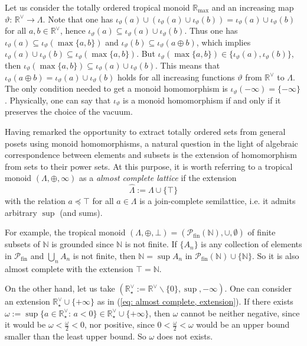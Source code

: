 \documentclass[11pt,british,reqno]{article}
\numberwithin{equation}{section}
\numberwithin{figure}{section}
\numberwithin{table}{section}
\theoremstyle{definition}
\theoremstyle{definition}
\theoremstyle{plain}
\theoremstyle{plain}
\theoremstyle{remark}
\theoremstyle{plain}
\numberwithin{equation}{section}
\numberwithin{figure}{section}
\numberwithin{table}{section}
\theoremstyle{plain}
\begin{document}
Let us consider the totally ordered tropical monoid $\mathbb{R}_{\max}$
and an increasing map $\vartheta:\,\mathbb{R}^{\vee}\longrightarrow\Lambda$.
Note that one has $\iota_{\vartheta}(a)\cup(\iota_{\vartheta}(a)\cup\iota_{\vartheta}(b))=\iota_{\vartheta}(a)\cup\iota_{\vartheta}(b)$
for all $a,b\in\mathbb{R}^{\vee}$, hence $\iota_{\vartheta}(a)\subseteq\iota_{\vartheta}(a)\cup\iota_{\vartheta}(b)$.
Thus one has $\iota_{\vartheta}(a)\subseteq\iota_{\vartheta}(\max\{a,b\})$
and $\iota_{\vartheta}(b)\subseteq\iota_{\vartheta}(a\oplus b)$, which
implies $\iota_{\vartheta}(a)\cup\iota_{\vartheta}(b)\subseteq\iota_{\vartheta}(\max\{a,b\})$.
But $\iota_{\vartheta}(\max\{a,b\})\in\{\iota_{\vartheta}(a),\iota_{\vartheta}(b)\}$,
then $\iota_{\vartheta}(\max\{a,b\})\subseteq\iota_{\vartheta}(a)\cup\iota_{\vartheta}(b)$.
This means that $\iota_{\vartheta}(a\oplus b)=\iota_{\vartheta}(a)\cup\iota_{\vartheta}(b)$
holds for all increasing functions $\vartheta$ from $\mathbb{R}^{\vee}$
to $\Lambda$. The only condition needed to get a monoid homomorphism
is $\iota_{\vartheta}(-\infty)=\{-\infty\}$. Physically, one can say
that $\iota_{\vartheta}$ is a monoid homomorphism if and only if it
preserves the choice of the vacuum. 

Having remarked the opportunity to extract totally ordered sets from general posets using monoid homomorphisms, a natural question in the light of algebraic correspondence between elements and subsets is the extension of homomorphism from sets to their power sets. At this purpose, it is worth referring to a tropical monoid $(\Lambda,\oplus,\infty)$ as a \textit{almost complete lattice} if the extension 
\begin{equation}
\hat{\Lambda}:=\Lambda\cup\{\top\}\label{eq: almost complete, extension}
\end{equation}
with the relation $a\preceq\top$ for all $a\in\Lambda$ is a join-complete
semilattice, i.e. it admits arbitrary $\sup$ (and sums). 

For example, the
tropical monoid $(\Lambda,\oplus,\bot)=(\mathcal{P}_{\mathrm{fin}}(\mathbb{N}),\cup,\emptyset)$ of finite subsets of $\mathbb{N}$ is grounded since $\mathbb{N}$ is not finite. If $\{A_{n}\}$ is any collection of elements in $\mathcal{P}_{\mathrm{fin}}$ and ${\displaystyle \bigcup_{n}A_{n}}$ is not finite, then $\mathbb{N}=\sup A_{n}$ in $\mathcal{P}_{\mathrm{fin}}(\mathbb{N})\cup\{\mathbb{N}\}$.
So it is also almost complete with the extension $\top=\mathbb{N}$. 

On the other hand, let us take $(\mathbb{R}_{\star}^{\vee}:=\mathbb{R}^{\vee}\backslash\{0\},\sup,-\infty)$. One can consider
an extension $\mathbb{R}_{\star}^{\vee}\cup\{+\infty\}$ as in (\ref{eq: almost complete, extension}).
If there exists ${\displaystyle \omega:=\sup\{a\in\mathbb{R}_{\star}^{\vee}:\,a<0\}\in\mathbb{R}_{\star}^{\vee}\cup\{+\infty\}}$,
then $\omega$ cannot be neither negative, since it would be ${\displaystyle \omega<\frac{\omega}{2}<0}$,
nor positive, since ${\displaystyle 0<\frac{\omega}{2}<\omega}$ would
be an upper bound smaller than the least upper bound. So $\omega$
does not exists. 
\end{document}
